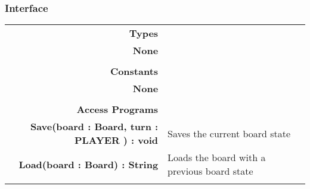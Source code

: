 \documentclass[10pt]{article}
\begin{document}
    \subsubsection{Interface}
        \begin{tabularx}{\linewidth}{@{} >{\bfseries}r Xp{5cm} }
            Types           & \begin{tabular}[t]{@{} l p{8cm}} 
                                     & \\
                                    None & \\
                              \end{tabular} \\
                              
            Constants       & \begin{tabular}[t]{@{} l p{8cm}} 
                                     & \\
                                    None & \\
                              \end{tabular} \\

            Access Programs & \begin{tabular}[t]{@{} p{4cm} p{8cm}}
                                     & \\
                                    Save(board : Board, turn : PLAYER ) : void & Saves the current board state \\
                                    Load(board : Board) : String & Loads the board with a previous board state \\ 
                              \end{tabular}
        \end{tabularx}
        
\end{document}
